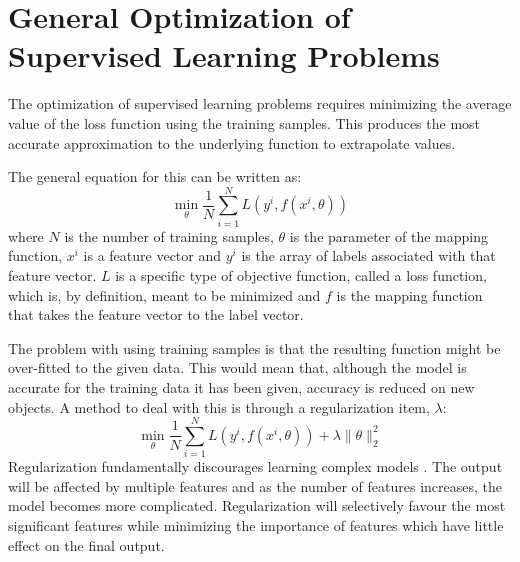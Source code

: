 \documentclass[10pt,a4paper]{report}
\begin{document}
		\section{General Optimization of Supervised Learning Problems}
			The optimization of supervised learning problems requires minimizing the average value of the loss function using the training samples. This produces the
			most accurate approximation to the underlying function to extrapolate values.\par
			The general equation \autocite[p. 3]{SurveyOfOptimizationMethods} for this can be written as:
			\begin{equation}
				\min_\theta \frac{1}{N} \sum_{i=1}^{N} L(y^i, f(x^i,\theta))
				\label{eq:supervised-learning-general}
			\end{equation}
			where $N$ is the number of training samples, $\theta$ is the parameter of the mapping function, $x^i$ is a feature vector
			and $y^i$ is the array of labels associated with that feature vector. $L$ is a specific type of objective function, called a loss function,
			which is, by definition, meant to be minimized and $f$ is the mapping function that takes the feature vector to the label vector. \par
			The problem with using training samples is that the resulting function might be over-fitted to the given data. This would mean
			that, although the model is accurate for the training data it has been given, accuracy is reduced on new objects. A method to
			deal with this is through a regularization item, $\lambda$:
			\begin{equation}
				\min_\theta \frac{1}{N} \sum_{i=1}^{N} L(y^i, f(x^i,\theta)) + \lambda\| \theta\|_{2}^{2}
				\label{eq:supervised-learning-regularization}
			\end{equation}
			Regularization fundamentally discourages learning complex models \autocite[p. 4]{OverfittingSupervisedLearning}. The output will be affected by multiple features and as the number of features increases,
			the model becomes more complicated. Regularization will selectively favour the most significant features while minimizing the importance of features which have little effect on the final output.
\end{document}
